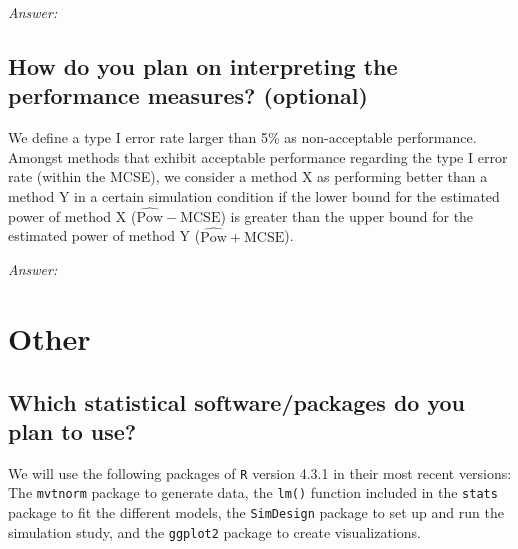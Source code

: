 \documentclass[12pt]{article}
\begin{document}
\textit{Answer:}

\subsection{How do you plan on interpreting the performance measures? \textmd{(optional)}}
    
    
\begin{examplebox}
We define a type I error rate larger than 5\% as non-acceptable performance. Amongst methods that exhibit acceptable performance regarding the type I error rate (within the MCSE), we consider a method X as performing better than a method Y in a certain simulation condition if the lower bound for the estimated power of method X ($\widehat{\text{Pow}}-\text{MCSE}$) is greater than the upper bound for the estimated power of method Y ($\widehat{\text{Pow}}+\text{MCSE}$).
\end{examplebox} 

\textit{Answer:}

\section{Other}
\subsection{Which statistical software/packages do you plan to use?}   

    
\begin{examplebox}
We will use the following packages of \texttt{R} version 4.3.1 \parencite{R2020} in their most recent versions: The \texttt{mvtnorm} package \parencite{Genz2009} to generate data, the \texttt{lm()} function included in the \texttt{stats} package \parencite{R2020} to fit the different models, the \texttt{SimDesign} package \parencite{Chalmers2020} to set up  and run the simulation study, and the \texttt{ggplot2} package \parencite{Wickham2016} to create visualizations.  
\end{examplebox}
\end{document}
